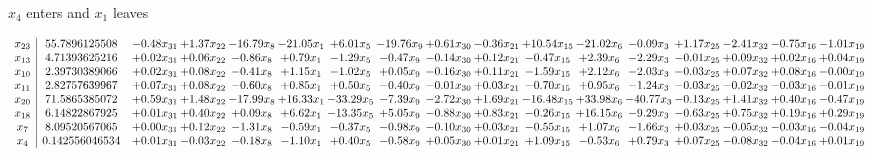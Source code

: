 \documentclass[9pt]{article}
\begin{document}
 $ x_{4} $ enters and $ x_{1} $ leaves 

 \[\begin{array}{c| c c@{\hskip 2pt} c@{\hskip 2pt} c@{\hskip 2pt} c@{\hskip 2pt} c@{\hskip 2pt} c@{\hskip 2pt} c@{\hskip 2pt} c@{\hskip 2pt} c@{\hskip 2pt} c@{\hskip 2pt} c@{\hskip 2pt} c@{\hskip 2pt} c@{\hskip 2pt} c@{\hskip 2pt} c@{\hskip 2pt} }
 x_{23}   &  55.7896125508 & -0.48 x_{31} & +  1.37 x_{22} & -16.79 x_{8} & -21.05 x_{1} & +  6.01 x_{5} & -19.76 x_{9} & +  0.61 x_{30} & -0.36 x_{21} & + 10.54 x_{15} & -21.02 x_{6} & -0.09 x_{3} & +  1.17 x_{25} & -2.41 x_{32} & -0.75 x_{16} & -1.01 x_{19}\\
 x_{13}   &  4.71393625216 & +  0.02 x_{31} & +  0.06 x_{22} & -0.86 x_{8} & +  0.79 x_{1} & -1.29 x_{5} & -0.47 x_{9} & -0.14 x_{30} & +  0.12 x_{21} & -0.47 x_{15} & +  2.39 x_{6} & -2.29 x_{3} & -0.01 x_{25} & +  0.09 x_{32} & +  0.02 x_{16} & +  0.04 x_{19}\\
 x_{10}   &  2.39730389066 & +  0.02 x_{31} & +  0.08 x_{22} & -0.41 x_{8} & +  1.15 x_{1} & -1.02 x_{5} & +  0.05 x_{9} & -0.16 x_{30} & +  0.11 x_{21} & -1.59 x_{15} & +  2.12 x_{6} & -2.03 x_{3} & -0.03 x_{25} & +  0.07 x_{32} & +  0.08 x_{16} & -0.00 x_{19}\\
 x_{11}   &  2.82757639967 & +  0.07 x_{31} & +  0.08 x_{22} & -0.60 x_{8} & +  0.85 x_{1} & +  0.50 x_{5} & -0.40 x_{9} & -0.01 x_{30} & +  0.03 x_{21} & -0.70 x_{15} & +  0.95 x_{6} & -1.24 x_{3} & -0.03 x_{25} & -0.02 x_{32} & -0.03 x_{16} & -0.01 x_{19}\\
 x_{20}   &  71.5865385072 & +  0.59 x_{31} & +  1.48 x_{22} & -17.99 x_{8} & + 16.33 x_{1} & -33.29 x_{5} & -7.39 x_{9} & -2.72 x_{30} & +  1.69 x_{21} & -16.48 x_{15} & + 33.98 x_{6} & -40.77 x_{3} & -0.13 x_{25} & +  1.41 x_{32} & +  0.40 x_{16} & -0.47 x_{19}\\
 x_{18}   &  6.14822867925 & +  0.01 x_{31} & +  0.40 x_{22} & +  0.09 x_{8} & +  6.62 x_{1} & -13.35 x_{5} & +  5.05 x_{9} & -0.88 x_{30} & +  0.83 x_{21} & -0.26 x_{15} & + 16.15 x_{6} & -9.29 x_{3} & -0.63 x_{25} & +  0.75 x_{32} & +  0.19 x_{16} & +  0.29 x_{19}\\
 x_{7}   &  8.09520567065 & +  0.00 x_{31} & +  0.12 x_{22} & -1.31 x_{8} & -0.59 x_{1} & -0.37 x_{5} & -0.98 x_{9} & -0.10 x_{30} & +  0.03 x_{21} & -0.55 x_{15} & +  1.07 x_{6} & -1.66 x_{3} & +  0.03 x_{25} & -0.05 x_{32} & -0.03 x_{16} & -0.04 x_{19}\\
 x_{4}   &  0.142556046534 & +  0.01 x_{31} & -0.03 x_{22} & -0.18 x_{8} & -1.10 x_{1} & +  0.40 x_{5} & -0.58 x_{9} & +  0.05 x_{30} & +  0.01 x_{21} & +  1.09 x_{15} & -0.53 x_{6} & +  0.79 x_{3} & +  0.07 x_{25} & -0.08 x_{32} & -0.04 x_{16} & +  0.01 x_{19}\\

\end{array}\]
\end{document}
